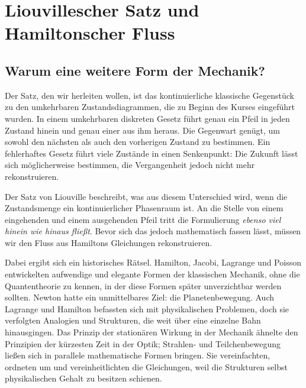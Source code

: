 \chapter{Liouvillescher Satz und Hamiltonscher Fluss}


\section{Warum eine weitere Form der Mechanik?}

Der Satz, den wir herleiten wollen, ist das kontinuierliche klassische Gegenstück zu den umkehrbaren Zustandsdiagrammen, die zu Beginn des Kurses eingeführt wurden. In einem umkehrbaren diskreten Gesetz führt genau ein Pfeil in jeden Zustand hinein und genau einer aus ihm heraus. Die Gegenwart genügt, um sowohl den nächsten als auch den vorherigen Zustand zu bestimmen. Ein fehlerhaftes Gesetz führt viele Zustände in einen Senkenpunkt: Die Zukunft lässt sich möglicherweise bestimmen, die Vergangenheit jedoch nicht mehr rekonstruieren.

Der Satz von Liouville beschreibt, was aus diesem Unterschied wird, wenn die Zustandsmenge ein kontinuierlicher Phasenraum ist. An die Stelle von einem eingehenden und einem ausgehenden Pfeil tritt die Formulierung \emph{ebenso viel hinein wie hinaus fließt}. Bevor sich das jedoch mathematisch fassen lässt, müssen wir den Fluss aus Hamiltons Gleichungen rekonstruieren.

Dabei ergibt sich ein historisches Rätsel. Hamilton, Jacobi, Lagrange und Poisson entwickelten aufwendige und elegante Formen der klassischen Mechanik, ohne die Quantentheorie zu kennen, in der diese Formen später unverzichtbar werden sollten. Newton hatte ein unmittelbares Ziel: die Planetenbewegung. Auch Lagrange und Hamilton befassten sich mit physikalischen Problemen, doch sie verfolgten Analogien und Strukturen, die weit über eine einzelne Bahn hinausgingen. Das Prinzip der stationären Wirkung in der Mechanik ähnelte den Prinzipien der kürzesten Zeit in der Optik; Strahlen- und Teilchenbewegung ließen sich in parallele mathematische Formen bringen. Sie vereinfachten, ordneten um und vereinheitlichten die Gleichungen, weil die Strukturen selbst physikalischen Gehalt zu besitzen schienen.

